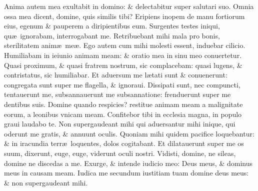 \documentclass[a5paper,10pt]{book}
\def\ae{æ}
\begin{document}
\begin{multicols*}{2}
\newline \color{red} A\color{black}nima autem mea exultabit in domino: \& delectabitur super salutari suo.
\newline \color{red} O\color{black}mnia ossa mea dicent, domine, quis similis tibi?
\newline \color{red} E\color{black}ripiens inopem de manu fortiorum eius, egenum \& pauperem a diripientibus eum.
\newline \color{red} S\color{black}urgentes testes iniqui, qu\ae \ ignorabam, interrogabant me.
\newline \color{red} R\color{black}etribuebant mihi mala pro bonis, sterilitatem anim\ae \ me\ae .
\newline \color{red} E\color{black}go autem cum mihi molesti essent, induebar cilicio.
\newline \color{red} H\color{black}umiliabam in ieiunio animam meam: \& oratio mea in sinu meo conuertetur.
\newline \color{red} Q\color{black}uasi proximum, \& quasi fratrem nostrum, sic complacebam: quasi lugens, \& contristatus, sic humiliabar.
\newline \color{red} E\color{black}t aduersum me l\ae tati sunt \& conuenerunt: congregata sunt super me flagella, \& ignoraui.
\newline \color{red} D\color{black}issipati sunt, nec compuncti, tentauerunt me, subsannauerunt me subsannatione: frenduerunt super me dentibus suis.
\newline \color{red} D\color{black}omine quando respicies? restitue animam meam a malignitate eorum, a leonibus vnicam meam.
\newline \color{red} C\color{black}onfitebor tibi in ecclesia magna, in populo graui laudabo te.
\newline \color{red} N\color{black}on supergaudeant mihi qui aduersantur mihi inique, qui oderunt me gratis, \& annuunt oculis.
\newline \color{red} Q\color{black}uoniam mihi quidem pacifice loquebantur: \& in iracundia terr\ae \ loquentes, dolos cogitabant.
\newline \color{red} E\color{black}t dilatauerunt super me os suum, dixerunt, euge, euge, viderunt oculi nostri.
\newline \color{red} V\color{black}idisti, domine, ne sileas, domine ne discedas a me.
\newline \color{red} E\color{black}xurge, \& intende iudicio meo: Deus meus, \& dominus meus in causam meam.
\newline \color{red} I\color{black}udica me secundum iustitiam tuam domine deus meus: \& non supergaudeant mihi.

\end{multicols*}
\end{document}
